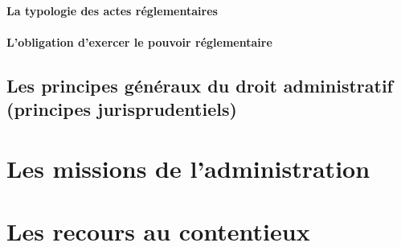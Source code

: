 \documentclass[10pt, a4paper, openany]{book}
\begin{document}
\subsection{La typologie des actes réglementaires}










\subsection{L'obligation d'exercer le pouvoir réglementaire}



\chapter{Les principes généraux du droit administratif (principes jurisprudentiels)}

\part{Les missions de l'administration}


\part{Les recours au contentieux}
\end{document}
